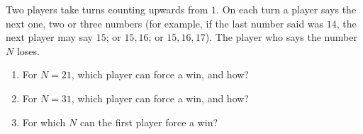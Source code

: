 Two players take turns counting upwards from $1$. On each turn a player says the next one, two or three numbers (for example, if the last number said was $14$, the next player may say $15$; or $15,16$; or $15,16,17$). The player who says the number $N$ loses.
\begin{enumerate}
\item[(a)] For $N=21$, which player can force a win, and how?
\item[(b)] For $N=31$, which player can force a win, and how?
\item[(c)] For which $N$ can the first player force a win?
\end{enumerate}
